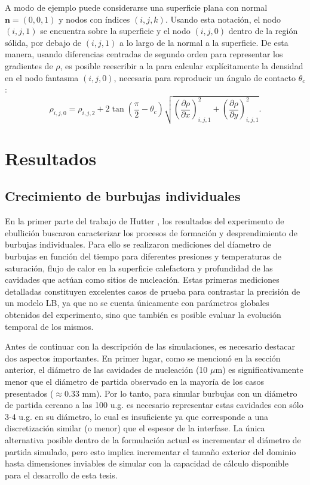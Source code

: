 A modo de ejemplo puede considerarse una superficie plana con normal $\bm{n} = (0,0,1)$ y nodos con \'indices $(i,j,k)$. Usando esta notaci\'on, el nodo $(i,j,1)$ se encuentra sobre la superficie y el nodo $(i,j,0)$ dentro de la regi\'on s\'olida, por debajo de $(i,j,1)$ a lo largo de la normal a la superficie. De esta manera, usando diferencias centradas de segundo orden para representar los gradientes de $\rho$, es posible reescribir a la  para calcular expl\'icitamente la densidad en el nodo fantasma $(i,j,0)$, necesaria para reproducir un \'angulo de contacto $\theta_c$:
\begin{equation}
	\rho_{i,j,0} = \rho_{i,j,2} + 2 \tan \left( \dfrac{\pi}{2} - \theta_c \right) \sqrt{\left( \dfrac{\partial \rho}{\partial x} \right)_{i,j,1}^2 + \left( \dfrac{\partial \rho}{\partial y} \right)_{i,j,1}^2}  .
\end{equation}



\section{Resultados}

\subsection{Crecimiento de burbujas individuales}

En la primer parte del trabajo de Hutter \cite{hutter_experimental_2010}, los resultados del experimento de ebullici\'on buscaron caracterizar los procesos de formaci\'on y desprendimiento de burbujas individuales. Para ello se realizaron mediciones del d\'iametro de burbujas en funci\'on del tiempo para diferentes presiones y temperaturas de saturaci\'on, flujo de calor en la superficie calefactora y profundidad de las cavidades que act\'uan como sitios de nucleaci\'on. Estas primeras mediciones detalladas constituyen excelentes casos de prueba para contrastar la precisi\'on de un modelo LB, ya que no se cuenta \'unicamente con par\'ametros globales obtenidos del experimento, sino que tambi\'en es posible evaluar la evoluci\'on temporal de los mismos.

Antes de continuar con la descripci\'on de las simulaciones, es necesario destacar dos aspectos importantes. En primer lugar, como se mencion\'o en la secci\'on anterior, el di\'ametro de las cavidades de nucleaci\'on (10 $\mu$m) es significativamente menor que el di\'ametro de partida observado en la mayor\'ia de los casos presentados ($\approx0.33$ mm). Por lo tanto, para simular burbujas con un di\'ametro de partida cercano a las 100 u.g. es necesario representar estas cavidades con s\'olo 3-4 u.g. en su di\'ametro, lo cual es insuficiente ya que corresponde a una discretizaci\'on similar (o menor) que el espesor de la interfase. La \'unica alternativa posible dentro de la formulaci\'on actual es incrementar el di\'ametro de partida simulado, pero esto implica incrementar el tama\~no exterior del dominio hasta dimensiones inviables de simular con la capacidad de c\'alculo disponible para el desarrollo de esta tesis.

